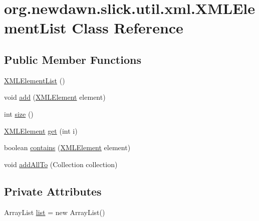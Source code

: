 \hypertarget{classorg_1_1newdawn_1_1slick_1_1util_1_1xml_1_1_x_m_l_element_list}{}\section{org.\+newdawn.\+slick.\+util.\+xml.\+X\+M\+L\+Element\+List Class Reference}
\label{classorg_1_1newdawn_1_1slick_1_1util_1_1xml_1_1_x_m_l_element_list}
\subsection*{Public Member Functions}
\begin{DoxyCompactItemize}
\item 
\mbox{\hyperlink{classorg_1_1newdawn_1_1slick_1_1util_1_1xml_1_1_x_m_l_element_list_a57bceba5513cb02cf9794e2433d5b540}{X\+M\+L\+Element\+List}} ()
\item 
void \mbox{\hyperlink{classorg_1_1newdawn_1_1slick_1_1util_1_1xml_1_1_x_m_l_element_list_a8c96e35bcd1302ab15810f88a0b6a212}{add}} (\mbox{\hyperlink{classorg_1_1newdawn_1_1slick_1_1util_1_1xml_1_1_x_m_l_element}{X\+M\+L\+Element}} element)
\item 
int \mbox{\hyperlink{classorg_1_1newdawn_1_1slick_1_1util_1_1xml_1_1_x_m_l_element_list_a5232dae8d4165a26a1c17360b0591efc}{size}} ()
\item 
\mbox{\hyperlink{classorg_1_1newdawn_1_1slick_1_1util_1_1xml_1_1_x_m_l_element}{X\+M\+L\+Element}} \mbox{\hyperlink{classorg_1_1newdawn_1_1slick_1_1util_1_1xml_1_1_x_m_l_element_list_a4c9ae5e68abe89eed0203d2c4774b34b}{get}} (int i)
\item 
boolean \mbox{\hyperlink{classorg_1_1newdawn_1_1slick_1_1util_1_1xml_1_1_x_m_l_element_list_aa28c4ed57a6a25c239bed647d92cde21}{contains}} (\mbox{\hyperlink{classorg_1_1newdawn_1_1slick_1_1util_1_1xml_1_1_x_m_l_element}{X\+M\+L\+Element}} element)
\item 
void \mbox{\hyperlink{classorg_1_1newdawn_1_1slick_1_1util_1_1xml_1_1_x_m_l_element_list_a0a52b054275544bda4c8efb625aff278}{add\+All\+To}} (Collection collection)
\end{DoxyCompactItemize}
\subsection*{Private Attributes}
\begin{DoxyCompactItemize}
\item 
Array\+List \mbox{\hyperlink{classorg_1_1newdawn_1_1slick_1_1util_1_1xml_1_1_x_m_l_element_list_ade4a37ed92cf6392dbea3cdc9d9e6a6f}{list}} = new Array\+List()
\end{DoxyCompactItemize}


